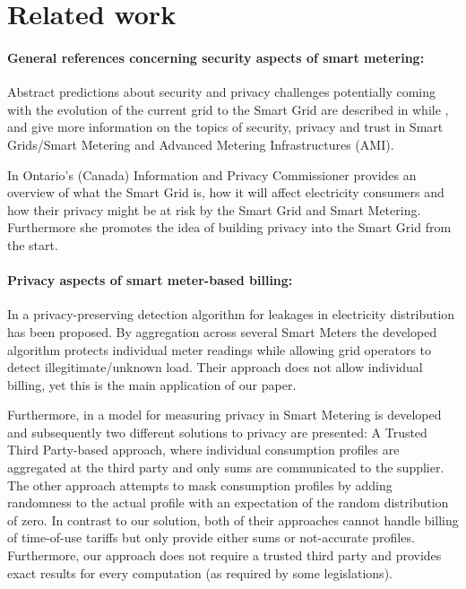 \documentclass[english]{llncs}
\begin{document}
\section{Related work}
\label{relatedwork}

\paragraph{General references concerning security aspects of smart metering:} 
Abstract predictions about security and privacy challenges potentially coming with the evolution of the current grid to the Smart Grid are described in \cite{johnsjawurek}
while \cite{trustsecprivforsmartgrid},\cite{secprivchallengessg} and \cite{smartgridprivacy} give more information on the topics of security, privacy and trust in Smart Grids/Smart Metering and Advanced Metering Infrastructures (AMI).

In \cite{smartgridprivacy} Ontario's (Canada) Information and Privacy Commissioner provides an overview of what the Smart Grid is, how it will affect electricity consumers and how their privacy might be at risk by the Smart Grid and Smart Metering. Furthermore she promotes the idea of building privacy into the Smart Grid from the start.

\paragraph{Privacy aspects of smart meter-based billing:}
In \cite{GarJac} a privacy-preserving detection algorithm for leakages in electricity distribution has been proposed.
By aggregation across several Smart Meters the developed algorithm protects individual meter readings while allowing grid operators to detect illegitimate/unknown load.
Their approach does not allow individual billing, yet this is the main application of our paper.


Furthermore, in \cite{privacymodel} a model for measuring privacy in Smart Metering is developed and subsequently two different solutions to privacy are presented: A Trusted Third Party-based approach, where individual consumption profiles are aggregated at the third party and only sums are communicated to the supplier. The other approach attempts to mask consumption profiles by adding randomness to the actual profile with an expectation of the random distribution of zero. In contrast to our solution, both of their approaches cannot handle billing of time-of-use tariffs but only provide either sums or not-accurate profiles. Furthermore, our approach does not require a trusted third party and provides exact results for every computation (as required by some legislations). 
\end{document}
